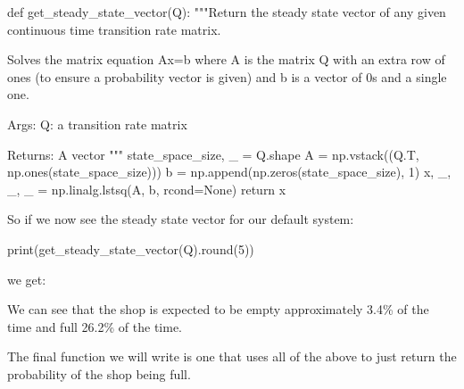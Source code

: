 \begin{pyin}
def get_steady_state_vector(Q):
    """Return the steady state vector of any given continuous
    time transition rate matrix.

    Solves the matrix equation Ax=b where A is the matrix Q
    with an extra row of ones (to ensure a probability vector
    is given) and b is a vector of 0s and a single one.

    Args:
       Q: a transition rate matrix

    Returns:
        A vector
    """
    state_space_size, _ = Q.shape
    A = np.vstack((Q.T, np.ones(state_space_size)))
    b = np.append(np.zeros(state_space_size), 1)
    x, _, _, _ = np.linalg.lstsq(A, b, rcond=None)
    return x
\end{pyin}

So if we now see the steady state vector for our default system:

\begin{pyin}
print(get_steady_state_vector(Q).round(5))
\end{pyin}

we get:

\begin{pyout}
[0.03431 0.08577 0.10722 0.13402 0.16752 0.2094  0.26176]
\end{pyout}

We can see that the shop is expected to be empty approximately 3.4\% of the time
and full 26.2\% of the time.

The final function we will write is one that uses all of
the above to just return the probability of the shop being full.


